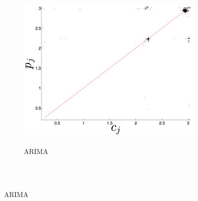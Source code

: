 \begin{figure}[htbp]
  \begin{subfigure}{0.6\columnwidth}
    \includegraphics[width=\columnwidth]{figs/svdfiveARIMAForecast.png}
    \caption{\svdfive \\ ARIMA }
    \label{fig:svd5ARIMA}
  \end{subfigure}%
  \\


\end{figure}
